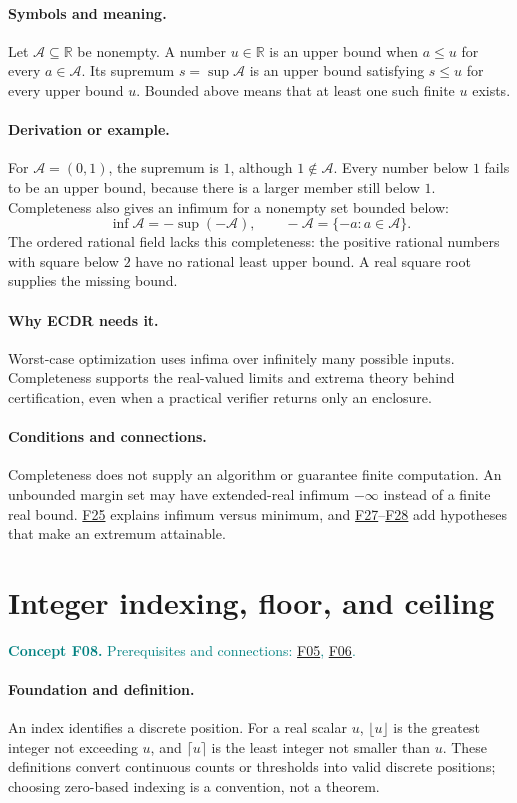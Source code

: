 \documentclass[11pt,a4paper]{article}
\newcommand{\R}{\mathbb R}
\newcommand{\conceptid}{Front matter}
\newcommand{\concept}[3]{\clearpage\renewcommand{\conceptid}{#1}%
\section{#2}\label{concept:#1}%
\textcolor{teal}{\textbf{Concept #1.} Prerequisites and connections: #3.}\par
\typeout{ECDR-CONCEPT-START #1 PAGE=\thepage}}
\begin{document}
\paragraph{Symbols and meaning.}
Let $\mathcal A\subseteq\R$ be nonempty. A number $u\in\R$ is an
upper bound when $a\le u$ for every $a\in\mathcal A$. Its supremum
$s=\sup\mathcal A$ is an upper bound satisfying $s\le u$ for every
upper bound $u$. Bounded above means that at least one such finite $u$
exists.
\paragraph{Derivation or example.}
For $\mathcal A=(0,1)$, the supremum is $1$, although
$1\notin\mathcal A$. Every number below $1$ fails to be an upper bound,
because there is a larger member still below $1$.
Completeness also gives an infimum for a nonempty set bounded below:
\[
 \inf\mathcal A=-\sup(-\mathcal A),\qquad
 -\mathcal A=\{-a:a\in\mathcal A\}.
\]
The ordered rational field lacks this completeness: the positive
rational numbers with square below $2$ have no rational least upper
bound. A real square root supplies the missing bound.
\paragraph{Why ECDR needs it.}
Worst-case optimization uses infima over infinitely many possible inputs.
Completeness supports the real-valued limits and extrema theory behind
certification, even when a practical verifier returns only an enclosure.
\paragraph{Conditions and connections.}
Completeness does not supply an algorithm or guarantee finite computation.
An unbounded margin set may have extended-real infimum $-\infty$ instead
of a finite real bound. \hyperref[concept:F25]{F25} explains infimum versus minimum, and
\hyperref[concept:F27]{F27}--\hyperref[concept:F28]{F28} add hypotheses that make an extremum attainable.
\par\label{endconcept:F07}

\concept{F08}{Integer indexing, floor, and ceiling}{\hyperref[concept:F05]{F05}, \hyperref[concept:F06]{F06}}
\paragraph{Foundation and definition.}
An index identifies a discrete position. For a real scalar $u$,
$\lfloor u\rfloor$ is the greatest integer not exceeding $u$, and
$\lceil u\rceil$ is the least integer not smaller than $u$. These
definitions convert continuous counts or thresholds into valid discrete
positions; choosing zero-based indexing is a convention, not a theorem.
\end{document}
